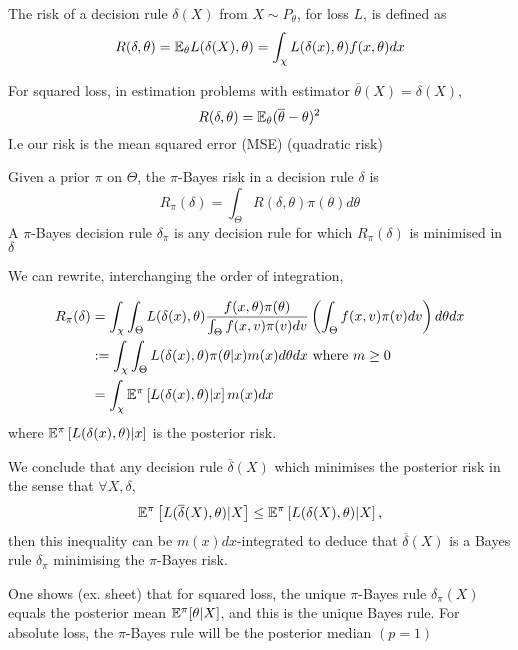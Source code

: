 \documentclass[a4paper]{article}
\begin{document}
\begin{defn}
	The risk of a decision rule $\delta(X)$ from $X \sim P_{\theta}$, for loss $L$, is defined as 
	\[
		R(\delta, \theta) = \mathbb{E}_{\theta} L(\delta(X),\theta) = \int_{\chi} L(\delta(x),\theta) f(x,\theta)dx
	\] 
\end{defn}

\begin{eg}
	For squared loss, in estimation problems with estimator $\overline{\theta}(X) = \delta(X)$,
	\[
		R(\delta,\theta) = \mathbb{E}_{\theta} (\overline{\theta} - \theta)^2
	\]
	I.e our risk is the mean squared error (MSE) (quadratic risk)
\end{eg}

\begin{defn}
	Given a prior $\pi$ on $\Theta$, the $\pi$-Bayes risk in a decision rule $\delta$ is 
	\[
		R_{\pi}(\delta) = \int_{\Theta} R(\delta, \theta) \pi(\theta) d\theta
	\]
	A $\pi$-Bayes decision rule $\delta_{\pi}$ is any decision rule for which $R_{\pi}(\delta)$ is minimised in $\delta$
\end{defn}

\newpage

We can rewrite, interchanging the order of integration,

\begin{align*}
	R_{\pi}(\delta) &= \int_{\chi} \int_{\Theta} L(\delta(x), \theta) \frac{f(x, \theta) \pi(\theta)}{\int_{\Theta} f(x, v) \pi(v) dv} \left( \int_{\Theta} f(x, v) \pi(v) dv \right) d\theta dx \\
	&:= \int_{\chi} \int_{\Theta} L(\delta(x), \theta) \pi(\theta |x) m(x) d\theta dx \text{ where } m\ge 0 \\
	&= \int_{\chi} \mathbb{E}^{\pi}\left[ L(\delta(x), \theta)  | x \right] m(x) dx \\
\end{align*}
where $\mathbb{E}^{\pi}\left[ L(\delta(x), \theta)  | x \right]$ is the posterior risk.

We conclude that any decision rule $\overline{\delta}(X)$ which minimises the posterior risk in the sense that $\forall X, \delta$,
\[
	\mathbb{E}^{\pi}\left[ L(\overline{\delta}(X), \theta)  | X \right] \le \mathbb{E}^{\pi}\left[ L(\delta(X), \theta)  | X \right]
,\]
then this inequality can be $m(x)dx$-integrated to deduce that $\overline{\delta}(X)$ is a Bayes rule $\delta_{\pi}$ minimising the $\pi$-Bayes risk.

\begin{remark}
	One shows (ex. sheet) that for squared loss, the unique $\pi$-Bayes rule $\delta_{\pi}(X)$ equals the posterior mean $\mathbb{E}^{\pi}[\theta | X]$, and this is the unique Bayes rule. For absolute loss, the $\pi$-Bayes rule will be the posterior median $(p=1)$
\end{remark}
\end{document}
